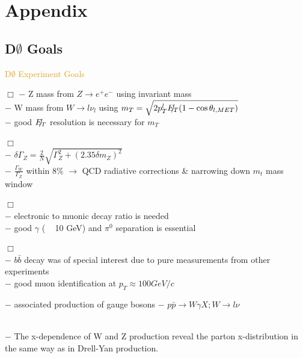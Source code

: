 
\section*{Appendix}


\subsection*{D$\emptyset$ Goals}
\begin{frame}{\textcolor{Goldenrod}{D$\emptyset$ Experiment Goals}}

  \itt[<only@+>]
\item[$\Box$] 
  $-$ Z mass from $ Z\to e^+ e^-$ using invariant mass\\
  $-$ W mass from $W\to l \nu_{l}$ using $m_{T} =
  \sqrt{2p^{l}_{T}\slashed{E_{T}}(1 - \cos\theta_{l, MET})}$\\
  $-$ good $\slashed{E_{T}}$ resolution is necessary for $m_T$
\item[$\Box$] \\
  $- $ \alert{$\delta \Gamma_Z = \frac{2}{N} \sqrt{\Gamma^2_Z + (2.35
      \delta m_Z)^2}$}\\
  $- $ $\frac{\Gamma_W}{\Gamma_Z}$ within 8\% $\to$ QCD radiative
  corrections  \& narrowing down $m_t$ mass window

\item[$\Box$]  \\
  $- $ electronic to muonic decay ratio is needed\\
  $- $ \alert{ good $\gamma$ ( ~ 10 GeV) and $\pi^0$ separation is
    essential}
  
\item[$\Box$] \\
  $- $ $b\bar{b}$ decay was of special interest due to pure measurements
  from other experiments\\
  $- $ good muon identification at $p_T \approx 100 GeV/c$
  
\item  {}
  $- $ associated production of gauge bosons
  $- $ $p\bar{p} \to W \gamma X; W \to l \nu$ 

\item {}\\
  $- $ The x-dependence of W and Z production reveal the parton
  x-distribution in the same way as in Drell-Yan production.\\
  

\end{frame}

